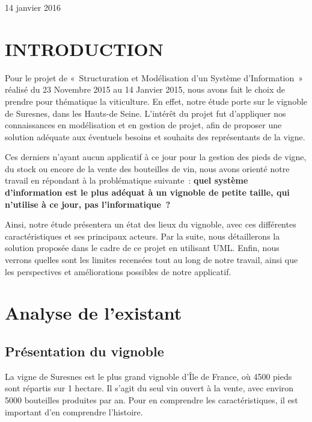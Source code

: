 \documentclass[a4paper, titlepage]{report}
\begin{document}
\begin{titlepage}
\begin{sffamily}
\begin{center}
    \vfill

    {\large 14 janvier 2016}

  \end{center}
  \end{sffamily}
\end{titlepage}

\chapter{INTRODUCTION}

Pour le projet de «~Structuration et Modélisation d'un Système
d'Information~» réalisé du 23 Novembre 2015 au 14 Janvier 2015, nous
avons fait le choix de prendre pour thématique la viticulture. En effet,
notre étude porte sur le vignoble de Suresnes, dans les Hauts-de Seine.
L'intérêt du projet fut d'appliquer nos connaissances en modélisation et
en gestion de projet, afin de proposer une solution adéquate aux
éventuels besoins et souhaits des représentants de la vigne.

Ces derniers n'ayant aucun applicatif à ce jour pour la gestion des
pieds de vigne, du stock ou encore de la vente des bouteilles de vin,
nous avons orienté notre travail en répondant à la problématique
suivante~: \textbf{quel système d'information est le plus adéquat à un
vignoble de petite taille, qui n'utilise à ce jour, pas
l'informatique~?}

Ainsi, notre étude présentera un état des lieux du vignoble, avec ces
différentes caractéristiques et ses principaux acteurs. Par la suite,
nous détaillerons la solution proposée dans le cadre de ce projet en
utilisant UML. Enfin, nous verrons quelles sont les limites recensées
tout au long de notre travail, ainsi que les perspectives et
améliorations possibles de notre applicatif.

\clearpage
\tableofcontents
\clearpage
\listoffigures
\clearpage

\chapter{Analyse de l'existant}

\section{Présentation du vignoble}

La vigne de Suresnes est le plus grand vignoble d'Île de France, où 4500
pieds sont répartis sur 1 hectare. Il s'agit du seul vin ouvert à la
vente, avec environ 5000 bouteilles produites par an. Pour en comprendre
les caractéristiques, il est important d'en comprendre l'histoire.
\end{document}
